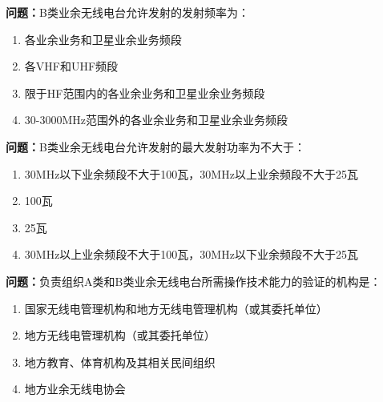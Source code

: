 \bigskip


\noindent\textbf{问题：}B类业余无线电台允许发射的发射频率为：
\begin{enumerate}[label=\Alph*), leftmargin=3em]
\item 各业余业务和卫星业余业务频段
\item 各VHF和UHF频段
\item 限于HF范围内的各业余业务和卫星业余业务频段
\item 30-3000MHz范围外的各业余业务和卫星业余业务频段
\end{enumerate}

\bigskip


\noindent\textbf{问题：}B类业余无线电台允许发射的最大发射功率为不大于：
\begin{enumerate}[label=\Alph*), leftmargin=3em]
\item 30MHz以下业余频段不大于100瓦，30MHz以上业余频段不大于25瓦
\item 100瓦
\item 25瓦
\item 30MHz以上业余频段不大于100瓦，30MHz以下业余频段不大于25瓦
\end{enumerate}

\bigskip


\noindent\textbf{问题：}负责组织A类和B类业余无线电台所需操作技术能力的验证的机构是：
\begin{enumerate}[label=\Alph*), leftmargin=3em]
\item 国家无线电管理机构和地方无线电管理机构（或其委托单位）
\item 地方无线电管理机构（或其委托单位）
\item 地方教育、体育机构及其相关民间组织
\item 地方业余无线电协会
\end{enumerate}

\bigskip
